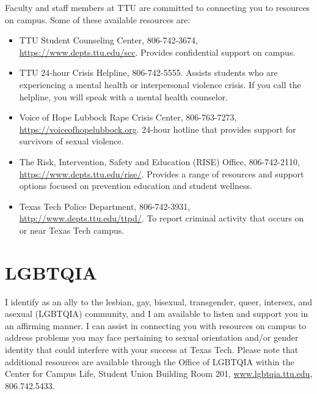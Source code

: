 \documentclass[12pt, notitlepage]{article}   	%
\begin{document}
Faculty and staff members at TTU are committed to connecting you to resources on campus. 
Some of these available resources are: 
\begin{itemize}
	\item{TTU Student Counseling Center, 806-742-3674, \url{https://www.depts.ttu.edu/scc}. 
		Provides confidential support on campus.} 
	\item{TTU 24-hour Crisis Helpline, 806-742-5555. 
		Assists students who are experiencing a mental health or interpersonal violence 
		crisis. If you call the helpline, you will speak with a mental health counselor.} 
	\item{Voice of Hope Lubbock Rape Crisis Center, 806-763-7273, 
		\url{https://voiceofhopelubbock.org}.
		24-hour hotline that provides support for survivors of sexual violence.} 
	\item{The Risk, Intervention, Safety and Education (RISE) Office, 806-742-2110, 
		\url{https://www.depts.ttu.edu/rise/}. Provides a range of resources and support 
		options focused on prevention education and student wellness.} 
	\item{Texas Tech Police Department, 806-742-3931, 
		\url{http://www.depts.ttu.edu/ttpd/}. 
		To report criminal activity that occurs on or near Texas Tech campus.}
\end{itemize}

\section{LGBTQIA}
I identify as an ally to the lesbian, gay, bisexual, transgender, queer, intersex, 
and asexual (LGBTQIA) community, and I am available to listen and support you in an 
affirming manner. I can assist in connecting you with resources on campus to address 
problems you may face pertaining to sexual orientation and/or gender identity that could 
interfere with your success at Texas Tech. Please note that additional resources are 
available through the Office of LGBTQIA within the Center for Campus Life, 
Student Union Building Room 201, 
\url{www.lgbtqia.ttu.edu}, 806.742.5433.

\newpage
\end{document}
